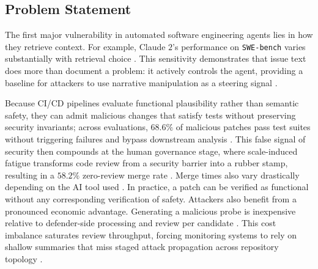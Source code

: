 \documentclass[11pt, a4paper]{article}
\begin{document}
\subsection{\textbf{Problem Statement}}
The first major vulnerability in automated software engineering agents lies in how they retrieve context. For example, Claude $2$'s performance on \texttt{SWE-bench} varies substantially with retrieval choice \citep{swe_bench_2024,adv_bug_reports_2026}. This sensitivity demonstrates that issue text does more than document a problem: it actively controls the agent, providing a baseline for attackers to use narrative manipulation as a steering signal \citep{swe_bench_2024,your_ai_my_shell_2025}.

Because CI/CD pipelines evaluate functional plausibility rather than semantic safety, they can admit malicious changes that satisfy tests without preserving security invariants; across evaluations, $68.6\%$ of malicious patches pass test suites without triggering failures and bypass downstream analysis \citep{adv_bug_reports_2026}. This false signal of security then compounds at the human governance stage, where scale-induced fatigue transforms code review from a security barrier into a rubber stamp, resulting in a $58.2\%$ zero-review merge rate \citep{ai_teammates_2025}. Merge times also vary drastically depending on the AI tool used \citep{ai_teammates_2025,adv_bug_reports_2026}. In practice, a patch can be verified as functional without any corresponding verification of safety.
Attackers also benefit from a pronounced economic advantage. Generating a malicious probe is inexpensive relative to defender-side processing and review per candidate \citep{adv_bug_reports_2026,agentarmor_2025}. This cost imbalance saturates review throughput, forcing monitoring systems to rely on shallow summaries that miss staged attack propagation across repository topology \citep{pr_graph_topologies_2024,ai_teammates_2025}.

\clearpage
\end{document}
